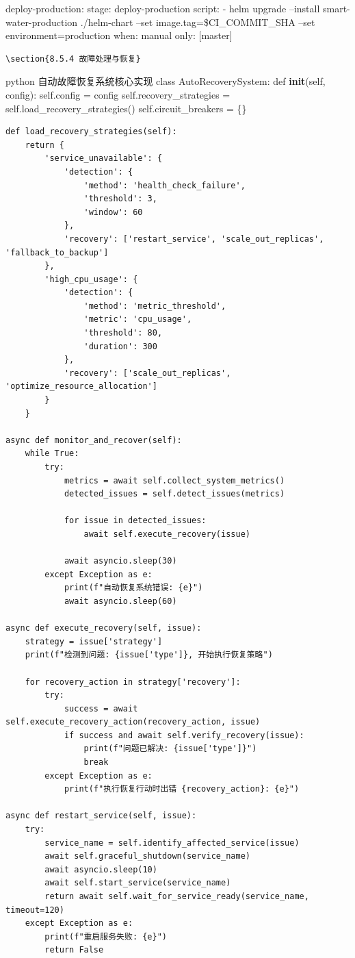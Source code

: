 deploy-production: stage: deploy-production script: - helm upgrade --install smart-water-production ./helm-chart --set image.tag=\$CI\_COMMIT\_SHA --set environment=production when: manual only: {[}master{]}

\begin{lstlisting}
\section{8.5.4 故障处理与恢复}

\end{lstlisting}

python  自动故障恢复系统核心实现 class AutoRecoverySystem: def \textbf{init}(self, config): self.config = config self.recovery\_strategies = self.load\_recovery\_strategies() self.circuit\_breakers = \{\}

\begin{verbatim}
def load_recovery_strategies(self):
    return {
        'service_unavailable': {
            'detection': {
                'method': 'health_check_failure',
                'threshold': 3,
                'window': 60
            },
            'recovery': ['restart_service', 'scale_out_replicas', 'fallback_to_backup']
        },
        'high_cpu_usage': {
            'detection': {
                'method': 'metric_threshold',
                'metric': 'cpu_usage',
                'threshold': 80,
                'duration': 300
            },
            'recovery': ['scale_out_replicas', 'optimize_resource_allocation']
        }
    }

async def monitor_and_recover(self):
    while True:
        try:
            metrics = await self.collect_system_metrics()
            detected_issues = self.detect_issues(metrics)
            
            for issue in detected_issues:
                await self.execute_recovery(issue)
                
            await asyncio.sleep(30)
        except Exception as e:
            print(f"自动恢复系统错误: {e}")
            await asyncio.sleep(60)

async def execute_recovery(self, issue):
    strategy = issue['strategy']
    print(f"检测到问题: {issue['type']}, 开始执行恢复策略")
    
    for recovery_action in strategy['recovery']:
        try:
            success = await self.execute_recovery_action(recovery_action, issue)
            if success and await self.verify_recovery(issue):
                print(f"问题已解决: {issue['type']}")
                break
        except Exception as e:
            print(f"执行恢复行动时出错 {recovery_action}: {e}")

async def restart_service(self, issue):
    try:
        service_name = self.identify_affected_service(issue)
        await self.graceful_shutdown(service_name)
        await asyncio.sleep(10)
        await self.start_service(service_name)
        return await self.wait_for_service_ready(service_name, timeout=120)
    except Exception as e:
        print(f"重启服务失败: {e}")
        return False
\end{verbatim}

